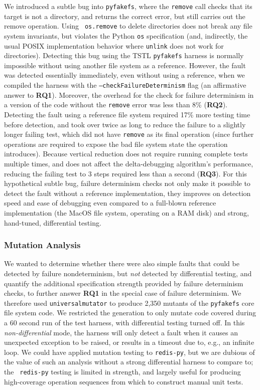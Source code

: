 We introduced a subtle bug into {\tt pyfakefs}, where the {\tt remove}
call checks that its target is not a directory, and returns the
correct error, but still carries out the remove operation.  Using {\tt
  os.remove} to delete directories does not break any file system
invariants, but violates the Python {\tt os} specification (and,
indirectly, the usual POSIX implementation behavior where {\tt unlink}
does not work for directories).  Detecting this bug using the TSTL
{\tt pyfakefs} harness is normally impossible without using another
file system as a reference.  However, the fault was detected  essentially
immediately, even without using a reference, when we compiled the harness
with the {\tt --checkFailureDeterminism} flag (an affirmative answer
to {\bf RQ1}).  Moreover, the overhead for the check for failure determinism in a
version of the code without the {\tt remove} error was
less than 8\%  ({\bf RQ2}).  Detecting the fault using a reference file system 
required 17\% more testing time before detection, and took over twice as
long to reduce the failure to a
slightly longer failing test, which did not have {\tt remove} as its
final operation (since further operations are required to 
expose the bad file system state the operation introduces).
Because vertical
reduction does not require running complete tests multiple times, and
does not affect the delta-debugging algorithm's performance, reducing
the failing test to 3 steps required less than a second ({\bf RQ3}).
For this hypothetical subtle bug, failure determinism checks not only make it
possible to detect the fault without a reference implementation, they
improves on detection speed and ease of debugging even compared to a
full-blown reference implementation (the MacOS file system, operating
on a RAM disk) and strong, hand-tuned, differential testing.

\subsubsection{Mutation Analysis}

We wanted to determine whether there were also simple faults that
could be detected by failure nondeterminism, but \emph{not} detected
by differential testing, and quantify the additional specification
strength provided by failure determinism checks, to further answer
{\bf RQ1} in the special case of failure determinism.  We therefore used
{\tt universalmutator} \cite{RegExpMut} to produce 2,350 mutants of
the {\tt pyfakefs} core file system code.   We restricted the generation
to only mutate code covered during a 60 second run of the test
harness, with differential testing turned off.  In this
\emph{non-differential} mode, the harness will only detect a fault when it
causes an unexpected exception to be raised, or results in a timeout
due to, e.g., an infinite loop.  We could have applied mutation
testing to {\tt redis-py}, but we are dubious of the value of such an
analysis without a strong differential harness to compare to; the {\tt
  redis-py} testing is limited in strength, and largely useful for
producing high-coverage operation sequences from which to construct
manual unit tests.

